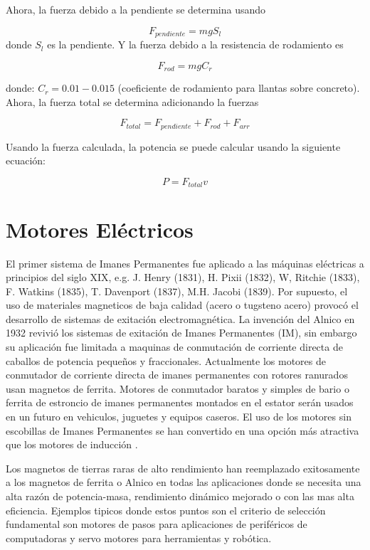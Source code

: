 \documentclass[12pt]{book}
\theoremstyle{definition}
\theoremstyle{remark}
\theoremstyle{plain}
\begin{document}
Ahora, la fuerza debido a la pendiente se determina usando

\begin{equation}
\label{equ201}
F_{pendiente}= m g S_l
\end{equation}
donde $S_l$ es la pendiente. Y la fuerza debido a la resistencia de rodamiento es

\begin{equation}
\label{equ202}
F_{rod}= m g C_r
\end{equation}

donde: $C_r=0.01-0.015$ (coeficiente de rodamiento para llantas sobre concreto).
Ahora, la fuerza total se determina adicionando la fuerzas

\begin{equation}
\label{equ203}
F_{total}= F_{pendiente}+F_{rod}+F_{arr}
\end{equation}

Usando la fuerza calculada, la potencia se puede calcular usando la siguiente ecuación:

\begin{equation}
\label{equ204}
P=F_{total}v
\end{equation}

\chapter{Motores Eléctricos}
El primer sistema de Imanes Permanentes fue aplicado a las máquinas eléctricas a principios del siglo XIX, e.g. J. Henry (1831), H. Pixii (1832), W, Ritchie (1833), 
F. Watkins (1835), T. Davenport (1837), M.H. Jacobi (1839). Por supuesto, el uso de materiales magneticos de baja calidad (acero o tugsteno acero) provocó el desarrollo 
de sistemas de exitación electromagnética. La invención del Alnico en 1932 revivió los sistemas  de exitación de Imanes Permanentes (IM), sin embargo su aplicación 
fue limitada a maquinas de conmutación de corriente directa de caballos de potencia pequeños y fraccionales. Actualmente los motores de conmutador de corriente directa 
de imanes permanentes  con rotores ranurados usan magnetos de ferrita. Motores de conmutador baratos y simples de bario o ferrita de estroncio de imanes permanentes 
montados en el estator serán usados en un futuro en vehiculos, juguetes y equipos caseros. El uso de los motores sin escobillas de Imanes Permanentes se han convertido 
en una opción más atractiva que los motores de inducción \cite{Gieras2002}.

Los magnetos de tierras raras de alto rendimiento han reemplazado exitosamente a los magnetos de ferrita o Alnico en todas las aplicaciones donde se necesita una alta 
razón de potencia-masa, rendimiento dinámico mejorado o con las mas alta eficiencia. Ejemplos tipicos donde estos puntos son el criterio de selección fundamental son 
motores de pasos para aplicaciones de  periféricos de  computadoras y servo motores para herramientas y robótica.
\end{document}
